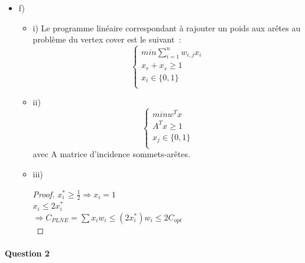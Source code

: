 \begin{itemize}
\item[] f)
\begin{itemize}
\item i)
Le programme linéaire correspondant à rajouter un poids aux arêtes au
problème du vertex cover est le suivant~:
\begin{equation}
\begin{cases}
min \sum_{i=1}^n w_{i, j}x_i \\
x_r + x_s \geq 1 \\
x_i \in \{ 0, 1 \} \\
\end{cases}
\end{equation}
\item ii)
\begin{equation}
\begin{cases}
min w^Tx \\
A^Tx \geq 1 \\
x_j \in \{0, 1\} \\
\end{cases}
\end{equation}
avec A matrice d'incidence sommets-arêtes.
\item iii) \begin{proof}
$x_i^*\geq \frac{1}{2} \Rightarrow x_i = 1$ \\
$x_i \leq 2x_i^*$ \\
$\Rightarrow C_{PLNE}=\sum x_iw_i \leq (2x_i^*)w_i \leq 2C_{opt}$ \\
\end{proof}
\end{itemize}
\end{itemize}

\paragraph{Question 2}

